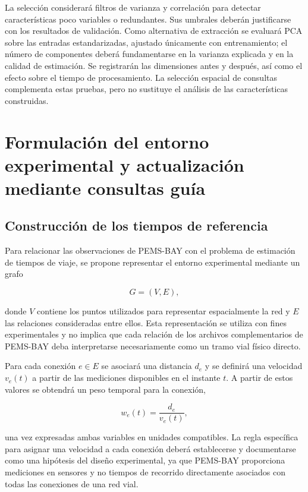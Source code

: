 \documentclass[11pt]{article}
\begin{document}
La selección considerará filtros de varianza y correlación para detectar
características poco variables o redundantes. Sus umbrales deberán
justificarse con los resultados de validación. Como alternativa de extracción
se evaluará PCA sobre las entradas estandarizadas, ajustado únicamente con
entrenamiento; el número de componentes deberá fundamentarse en la varianza
explicada y en la calidad de estimación. Se registrarán las dimensiones antes
y después, así como el efecto sobre el tiempo de procesamiento. La selección
espacial de consultas complementa estas pruebas, pero no sustituye el análisis
de las características construidas.

\section{Formulación del entorno experimental y actualización mediante consultas guía}
\label{sec:entorno}

\subsection{Construcción de los tiempos de referencia}
\label{sec:tiempos}

Para relacionar las observaciones de PEMS-BAY con el problema de estimación
de tiempos de viaje, se propone representar el entorno experimental mediante
un grafo

\[
G=(V,E),
\]

donde \(V\) contiene los puntos utilizados para representar espacialmente la
red y \(E\) las relaciones consideradas entre ellos. Esta representación se
utiliza con fines experimentales y no implica que cada relación de los
archivos complementarios de PEMS-BAY deba interpretarse necesariamente como
un tramo vial físico directo.

Para cada conexión \(e\in E\) se asociará una distancia \(d_e\) y se definirá
una velocidad \(v_e(t)\) a partir de las mediciones disponibles en el instante
\(t\). A partir de estos valores se obtendrá un peso temporal para la
conexión,

\[
w_e(t)=\frac{d_e}{v_e(t)},
\]

una vez expresadas ambas variables en unidades compatibles. La regla
específica para asignar una velocidad a cada conexión deberá establecerse y
documentarse como una hipótesis del diseño experimental, ya que PEMS-BAY
proporciona mediciones en sensores y no tiempos de recorrido directamente
asociados con todas las conexiones de una red vial.
\end{document}
